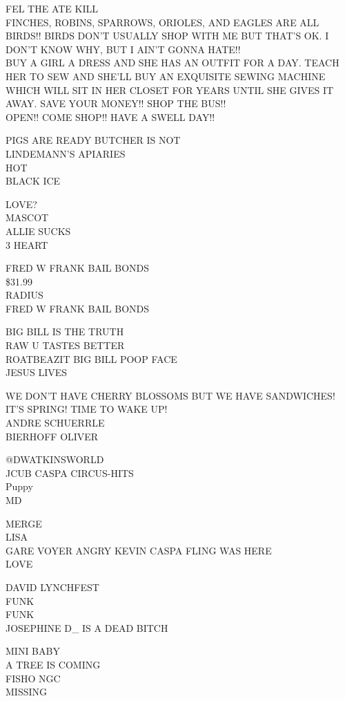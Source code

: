 \documentclass[10pt,letterpaper]{article}
\begin{document}
FEL THE ATE KILL\\
FINCHES, ROBINS, SPARROWS, ORIOLES, AND EAGLES ARE ALL BIRDS!!  BIRDS DON'T USUALLY SHOP WITH ME BUT THAT'S OK.  I DON'T KNOW WHY, BUT I AIN'T GONNA HATE!!\\
BUY A GIRL A DRESS AND SHE HAS AN OUTFIT FOR A DAY.  TEACH HER TO SEW AND SHE'LL BUY AN EXQUISITE SEWING MACHINE WHICH WILL SIT IN HER CLOSET FOR YEARS UNTIL SHE GIVES IT AWAY.  SAVE YOUR MONEY!! SHOP THE BUS!!\\
OPEN!! COME SHOP!! HAVE A SWELL DAY!!

PIGS ARE READY BUTCHER IS NOT\\
LINDEMANN'S APIARIES\\
HOT\\
BLACK ICE

LOVE?\\
MASCOT\\
ALLIE SUCKS\\
3 HEART

FRED W FRANK BAIL BONDS\\
\$31.99\\
RADIUS\\
FRED W FRANK BAIL BONDS

BIG BILL IS THE TRUTH\\
RAW U TASTES BETTER\\
ROATBEAZIT BIG BILL POOP FACE\\
JESUS LIVES

WE DON'T HAVE CHERRY BLOSSOMS BUT WE HAVE SANDWICHES!\\
IT'S SPRING! TIME TO WAKE UP!\\
ANDRE SCHUERRLE\\
BIERHOFF OLIVER

@DWATKINSWORLD\\
JCUB CASPA CIRCUS{-}HITS\\
Puppy\\
MD

MERGE\\
LISA\\
GARE VOYER ANGRY KEVIN CASPA FLING WAS HERE\\
LOVE

DAVID LYNCHFEST\\
FUNK\\
FUNK\\
JOSEPHINE D\_ IS A DEAD BITCH

MINI BABY\\
A TREE IS COMING\\
FISHO NGC\\
MISSING
\end{document}
